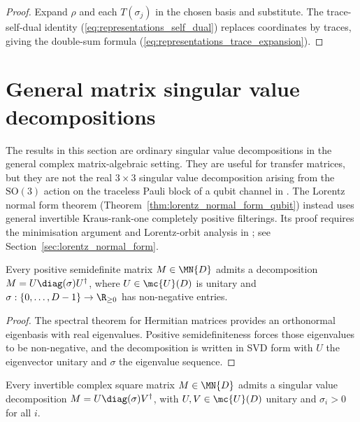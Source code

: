 \begin{proof}
    \leanok
    Expand $\rho$ and each $T(\sigma_j)$ in the chosen basis and substitute.
    The trace-self-dual identity (\ref{eq:representations_self_dual}) replaces
    coordinates by traces, giving the double-sum formula
    (\ref{eq:representations_trace_expansion}).
\end{proof}

\section{General matrix singular value decompositions}
\label{sec:svd_normal_form}

The results in this section are ordinary singular value decompositions in the
general complex matrix-algebraic setting. They are useful for transfer matrices, but
they are not the real $3\times3$ singular value decomposition arising from the
    $\mathrm{SO}(3)$ action on the traceless Pauli block of a qubit channel in
\cite[Section~2.4]{Wolf2012Quantum}. The Lorentz normal form theorem
(Theorem~\ref{thm:lorentz_normal_form_qubit}) instead uses general invertible
Kraus-rank-one completely positive filterings. Its proof requires the
minimisation argument and Lorentz-orbit analysis in
\cite[Propositions~2.9 and~2.11]{Wolf2012Quantum}; see
Section~\ref{sec:lorentz_normal_form}.

\begin{theorem}
    \label{thm:svd_posSemidef}
    \leanok
    Every positive semidefinite matrix $M \in \MN{D}$ admits a decomposition
    $M=U\diag(\sigma)U^{\dagger}$, where $U \in \mc{U}(D)$ is unitary and
    $\sigma : \{0,\ldots,D-1\} \to \R_{\ge 0}$ has non-negative entries.
\end{theorem}

\begin{proof}\leanok
    The spectral theorem for Hermitian matrices provides an orthonormal
    eigenbasis with real eigenvalues. Positive semidefiniteness forces those
    eigenvalues to be non-negative, and the decomposition is written in SVD
    form with $U$ the eigenvector unitary and $\sigma$ the eigenvalue sequence.
\end{proof}

\begin{theorem}
    \label{thm:svd_of_isUnit}
    \leanok
    Every invertible complex square matrix $M \in \MN{D}$ admits a singular
    value decomposition $M=U\diag(\sigma)V^{\dagger}$, with
    $U,V \in \mc{U}(D)$ unitary and $\sigma_i>0$ for all $i$.
\end{theorem}


